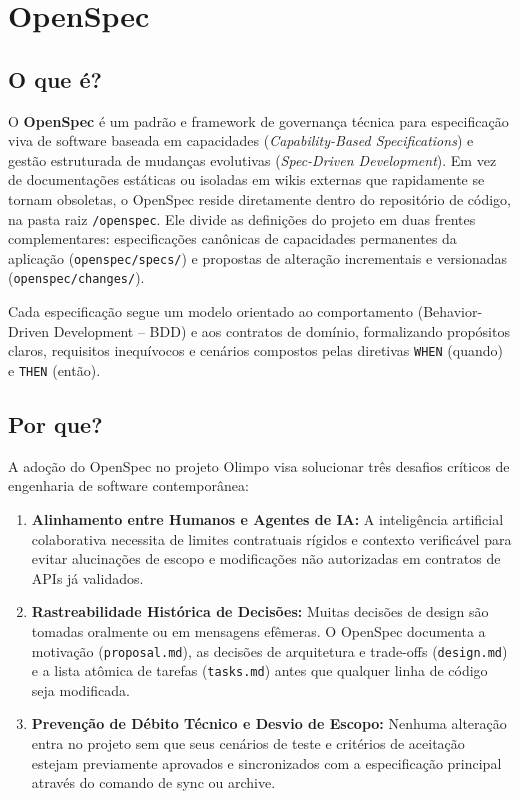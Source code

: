 \documentclass[12pt,a4paper]{article}
\begin{document}
\section{OpenSpec}

\subsection{O que é?}
O \textbf{OpenSpec} é um padrão e framework de governança técnica para especificação viva de software baseada em capacidades (\textit{Capability-Based Specifications}) e gestão estruturada de mudanças evolutivas (\textit{Spec-Driven Development}). Em vez de documentações estáticas ou isoladas em wikis externas que rapidamente se tornam obsoletas, o OpenSpec reside diretamente dentro do repositório de código, na pasta raiz \texttt{/openspec}. Ele divide as definições do projeto em duas frentes complementares: especificações canônicas de capacidades permanentes da aplicação (\texttt{openspec/specs/}) e propostas de alteração incrementais e versionadas (\texttt{openspec/changes/}).

Cada especificação segue um modelo orientado ao comportamento (Behavior-Driven Development -- BDD) e aos contratos de domínio, formalizando propósitos claros, requisitos inequívocos e cenários compostos pelas diretivas \texttt{WHEN} (quando) e \texttt{THEN} (então).

\subsection{Por que?}
A adoção do OpenSpec no projeto Olimpo visa solucionar três desafios críticos de engenharia de software contemporânea:
\begin{enumerate}
  \item \textbf{Alinhamento entre Humanos e Agentes de IA:} A inteligência artificial colaborativa necessita de limites contratuais rígidos e contexto verificável para evitar alucinações de escopo e modificações não autorizadas em contratos de APIs já validados.
  \item \textbf{Rastreabilidade Histórica de Decisões:} Muitas decisões de design são tomadas oralmente ou em mensagens efêmeras. O OpenSpec documenta a motivação (\texttt{proposal.md}), as decisões de arquitetura e trade-offs (\texttt{design.md}) e a lista atômica de tarefas (\texttt{tasks.md}) antes que qualquer linha de código seja modificada.
  \item \textbf{Prevenção de Débito Técnico e Desvio de Escopo:} Nenhuma alteração entra no projeto sem que seus cenários de teste e critérios de aceitação estejam previamente aprovados e sincronizados com a especificação principal através do comando de sync ou archive.
\end{enumerate}
\end{document}
